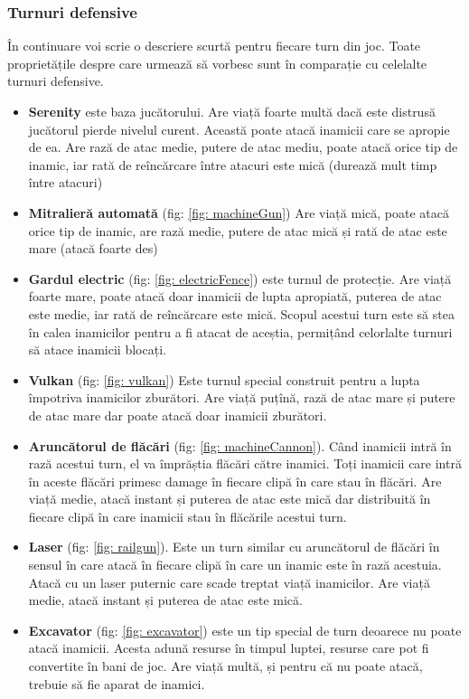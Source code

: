 \documentclass[12pt, a4paper]{article}
\begin{document}
	\subsubsection{Turnuri defensive}
	În continuare voi scrie o descriere scurtă pentru fiecare turn din joc. Toate proprietățile despre care urmează să vorbesc sunt în comparație cu celelalte turnuri defensive.
	\begin{itemize}
		\item \textbf{Serenity} este baza jucătorului. Are viață foarte multă dacă este distrusă jucătorul pierde nivelul curent. Această poate atacă inamicii care se apropie de ea. Are rază de atac medie, putere de atac mediu, poate atacă orice tip de inamic, iar rată de reîncărcare între atacuri este mică (durează mult timp între atacuri)
		\item \textbf{Mitralieră automată} (fig: \ref{fig: machineGun}) Are viață mică, poate atacă orice tip de inamic, are rază medie, putere de atac mică și rată de atac este mare (atacă foarte des)
		\item \textbf{Gardul electric} (fig: \ref{fig: electricFence}) este turnul de protecție. Are viață foarte mare, poate atacă doar inamicii de lupta apropiată, puterea de atac este medie, iar rată de reîncărcare este mică. Scopul acestui turn este să stea în calea inamicilor pentru a fi atacat de aceștia, permițând celorlalte turnuri să atace inamicii blocați.
		\item \textbf{Vulkan} (fig: \ref{fig: vulkan}) Este turnul special construit pentru a lupta împotriva inamicilor zburători. Are viață puțînă, rază de atac mare și putere de atac mare dar poate atacă doar inamicii zburători.
		\item \textbf{Aruncătorul de flăcări} (fig: \ref{fig: machineCannon}). Când inamicii intră în rază acestui turn, el va împrăștia flăcări către inamici. Toți inamicii care intră în aceste flăcări primesc damage în fiecare clipă în care stau în flăcări. Are viață medie, atacă instant și puterea de atac este mică dar distribuită în fiecare clipă în care inamicii stau în flăcările acestui turn.
		\item \textbf{Laser} (fig: \ref{fig: railgun}). Este un turn similar cu aruncătorul de flăcări în sensul în care atacă în fiecare clipă în care un inamic este în rază acestuia. Atacă cu un laser puternic care scade treptat viață inamicilor. Are viață medie, atacă instant și puterea de atac este mică.
		\item \textbf{Excavator} (fig: \ref{fig: excavator}) este un tip special de turn deoarece nu poate atacă inamicii. Acesta adună resurse în timpul luptei, resurse care pot fi convertite în bani de joc. Are viață multă, și pentru că nu poate atacă, trebuie să fie aparat de inamici.
	\end{itemize}
	
\end{document}
